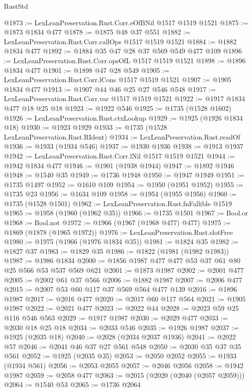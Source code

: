 \begin{lexlean}{RustStd}
\begin{coremodule}
@1873 := LexLeanPreservation.Rust.Corr.eOfBNil @1517 @1519 @1521
@1875 := @1873 @1834 @477
@1878 := @1875 @48 @37 @551
@1882 := LexLeanPreservation.Rust.Corr.callOps @1517 @1519 @1521
@1884 := @1882 @1834 @477
@1892 := @1884 @35 @47 @28 @37 @569 @549 @477 @109
@1896 := LexLeanPreservation.Rust.Corr.opsOfL @1517 @1519 @1521
@1898 := @1896 @1834 @477
@1901 := @1898 @47 @28 @549
@1905 := LexLeanPreservation.Rust.Corr.lCons @1517 @1519 @1521
@1907 := @1905 @1834 @477
@1913 := @1907 @44 @46 @25 @27 @546 @548
@1917 := LexLeanPreservation.Rust.Corr.var @1517 @1519 @1521
@1922 := @1917 @1834 @477 @18 @25 @18
@1923 := @1922 @546
@1925 := @1735 (@1528 @1602)
@1926 := LexLeanPreservation.Rust.ctxLookup
@1929 := @1925 (@1926 @1834 @18)
@1930 := @1923 @1929
@1933 := @1735 (@1528 LexLeanPreservation.Rust.RIdent)
@1934 := LexLeanPreservation.Rust.readOf
@1936 := @1933 (@1934 @546)
@1937 := @1930 @1936
@1938 := @1913 @1937
@1942 := LexLeanPreservation.Rust.Corr.lNil @1517 @1519 @1521
@1944 := @1942 @1834 @477
@1946 := @1901 (@1938 @1944)
@1947 := @1892 @1946
@1948 := @1540 @35
@1949 := @1736 @1948
@1950 := @1947 @1949
@1951 := @1735 @1497
@1952 := @1610 @109
@1954 := @1950 (@1951 @1952)
@1955 := @1735 @23
@1956 := @1634 @109
@1958 := @1954 (@1955 @1956)
@1960 := @1735 (@1528 @1501)
@1962 := LexLeanPreservation.Rust.fnFallible @1519
@1965 := @1958 (@1960 (@1962 @35))
@1966 := @1735 @1501
@1967 := Bool.or
@1968 := Bool.not
@1972 := @1966 (@1967 (@1968 @477) @477)
@1975 := @1869 (@1878 (@1965 @1972))
@1976 := LexLeanPreservation.Rust.slotFree
@1980 := @1975 (@1966 (@1976 @1834 @35))
@1981 := @1824 @35
@1982 := @1827 @37
@1983 := @1829 @35
@1986 := @1822 (@1981 (@1982 @1983))
@1987 := @1986 @1834
@2000 := @1856 @1987 @477 @477 @53 @37 @61 @80 @25 @566 @53 @537 @569 @621
@2001 := @1873 @1987
@2002 := @2001 @477
@2005 := @2002 @61 @37 @566
@2006 := @1882 @1987
@2007 := @2006 @477
@2015 := @2007 @53 @60 @117 @37 @569 @564 @477 @139
@2016 := @1896 @1987
@2017 := @2016 @477
@2020 := @2017 @60 @117 @564
@2021 := @1905 @1987
@2022 := @2021 @477
@2023 := @2022 @44
@2028 := @2023 @59 @25 @116 @546 @563
@2029 := @1917 @1987
@2030 := @2029 @477
@2033 := @2030 @18 @25 @18
@2034 := @2033 @546
@2035 := @1926 @1987
@2037 := @1925 (@2035 @18)
@2040 := @2028 (@2034 @2037 @1936)
@2041 := @2022 @57
@2046 := @2041 @46 @37 @27 @561 @548
@2050 := @2030 @35 @37 @35 @561
@2052 := @1925 (@2035 @35)
@2053 := @2050 @2052
@2055 := @1933 (@1934 @561)
@2056 := @2053 @2055
@2057 := @2046 @2056
@2058 := @1942 @1987
@2059 := @2058 @477
@2063 := @2015 (@2020 (@2040 (@2057 @2059)))
@2064 := @1540 @53
@2065 := @1736 @2064

\end{coremodule}
\end{lexlean}
